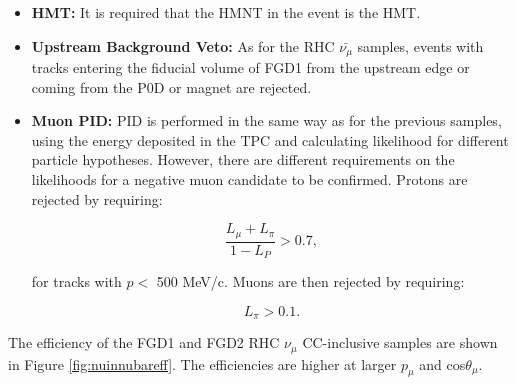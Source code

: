 \begin{itemize}

\item \textbf{HMT:} It is required that the HMNT  in the event is the HMT.

\item \textbf{Upstream Background Veto:} As for the RHC $\bar{\nu_{\mu}}$ samples, events with tracks entering the fiducial volume of FGD1 from the upstream edge or coming from the P0D or magnet are rejected.

\item \textbf{Muon PID:} PID is performed in the same way as for the previous samples, using the energy deposited in the TPC and calculating likelihood for different particle hypotheses. However, there are different requirements on the likelihoods for a negative muon candidate to be confirmed. Protons are rejected by requiring:

\begin{equation}
\frac{L_{\mu}+L_{\pi}}{1-L_P} > 0.7,
\end{equation}

for tracks with  $p <$ 500 MeV/c. Muons are then rejected by requiring:

\begin{equation}
L_{\pi} > 0.1.
\end{equation}

\end{itemize}

The efficiency of the FGD1 and FGD2 RHC $\nu_{\mu}$ CC-inclusive samples are shown in Figure \ref{fig:nuinnubareff}. The efficiencies are higher at larger $p_{\mu}$ and cos$\theta_{\mu}$.

